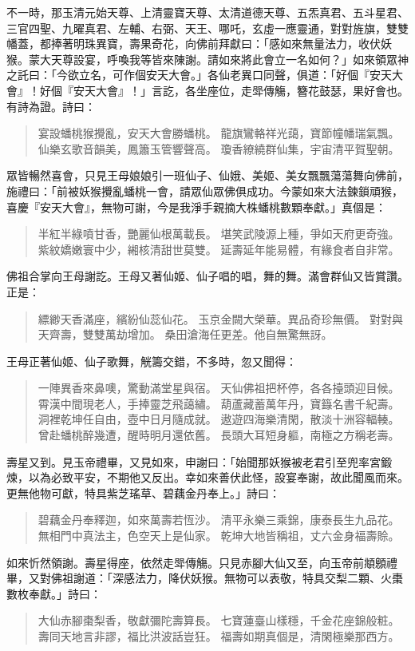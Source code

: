 不一時，那玉清元始天尊、上清靈寶天尊、太清道德天尊、五炁真君、五斗星君、三官四聖、九曜真君、左輔、右弼、天王、哪吒，玄虛一應靈通，對對旌旗，雙雙幡蓋，都捧著明珠異寶，壽果奇花，向佛前拜獻曰：「感如來無量法力，收伏妖猴。蒙大天尊設宴，呼喚我等皆來陳謝。請如來將此會立一名如何？」如來領眾神之託曰：「今欲立名，可作個安天大會。」各仙老異口同聲，俱道：「好個『安天大會』！好個『安天大會』！」言訖，各坐座位，走斝傳觴，簪花鼓瑟，果好會也。有詩為證。詩曰：
\begin{quote}
宴設蟠桃猴攪亂，安天大會勝蟠桃。
龍旗鸞輅祥光藹，寶節幢幡瑞氣飄。
仙樂玄歌音韻美，鳳簫玉管響聲高。
瓊香繚繞群仙集，宇宙清平賀聖朝。
\end{quote}

眾皆暢然喜會，只見王母娘娘引一班仙子、仙娥、美姬、美女飄飄蕩蕩舞向佛前，施禮曰：「前被妖猴攪亂蟠桃一會，請眾仙眾佛俱成功。今蒙如來大法鍊鎖頑猴，喜慶『安天大會』，無物可謝，今是我淨手親摘大株蟠桃數顆奉獻。」真個是：
\begin{quote}
半紅半綠噴甘香，艷麗仙根萬載長。
堪笑武陵源上種，爭如天府更奇強。
紫紋嬌嫩寰中少，緗核清甜世莫雙。
延壽延年能易體，有緣食者自非常。
\end{quote}

佛祖合掌向王母謝訖。王母又著仙姬、仙子唱的唱，舞的舞。滿會群仙又皆賞讚。正是：
\begin{quote}
縹緲天香滿座，繽紛仙蕊仙花。
玉京金闕大榮華。異品奇珍無價。
對對與天齊壽，雙雙萬劫增加。
桑田滄海任更差。他自無驚無訝。
\end{quote}

王母正著仙姬、仙子歌舞，觥籌交錯，不多時，忽又聞得：
\begin{quote}
一陣異香來鼻噢，驚動滿堂星與宿。
天仙佛祖把杯停，各各擡頭迎目候。
霄漢中間現老人，手捧靈芝飛藹繡。
葫蘆藏蓄萬年丹，寶籙名書千紀壽。
洞裡乾坤任自由，壺中日月隨成就。
遨遊四海樂清閑，散淡十洲容輻輳。
曾赴蟠桃醉幾遭，醒時明月還依舊。
長頭大耳短身軀，南極之方稱老壽。
\end{quote}

壽星又到。見玉帝禮畢，又見如來，申謝曰：「始聞那妖猴被老君引至兜率宮鍛煉，以為必致平安，不期他又反出。幸如來善伏此怪，設宴奉謝，故此聞風而來。更無他物可獻，特具紫芝瑤草、碧藕金丹奉上。」詩曰：
\begin{quote}
碧藕金丹奉釋迦，如來萬壽若恆沙。
清平永樂三乘錦，康泰長生九品花。
無相門中真法主，色空天上是仙家。
乾坤大地皆稱祖，丈六金身福壽賒。
\end{quote}

如來忻然領謝。壽星得座，依然走斝傳觴。只見赤腳大仙又至，向玉帝前頫顖禮畢，又對佛祖謝道：「深感法力，降伏妖猴。無物可以表敬，特具交梨二顆、火棗數枚奉獻。」詩曰：
\begin{quote}
大仙赤腳棗梨香，敬獻彌陀壽算長。
七寶蓮臺山樣穩，千金花座錦般粧。
壽同天地言非謬，福比洪波話豈狂。
福壽如期真個是，清閑極樂那西方。
\end{quote}

